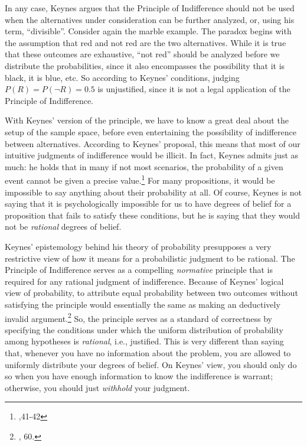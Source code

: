 In any case, Keynes argues that the Principle of
Indifference should not be used when the alternatives under
consideration can be further analyzed, or, using his term,
``divisible''. Consider again the marble example. The paradox begins
with the assumption that red and not red are the two alternatives. While
it is true that these outcomes are exhaustive, ``not red'' should be
analyzed before we distribute the probabilities, since it also
encompasses the possibility that it is black, it is blue, etc. So
according to Keynes' conditions, judging \(P(R) = P(\neg R) = 0.5\) is
unjustified, since it is not a legal application of the Principle of
Indifference.

With Keynes' version of the principle, we have to know a great deal
about the setup of the sample space, before even entertaining the
possibility of indifference between alternatives. According to Keynes'
proposal, this means that most of our intuitive judgments of
indifference would be illicit. In fact, Keynes admits just as much: he
holds that in many if not most scenarios, the probability of a given
event cannot be given a precise value.\footnote{\cite{keynes},41-42} For many propositions, it would
be impossible to say anything about their probability at all. Of course,
Keynes is not saying that it is psychologically impossible for us to
have degrees of belief for a proposition that fails to satisfy these
conditions, but he is saying that they would not be \emph{rational}
degrees of belief.

Keynes' epistemology behind his theory of probability presupposes a very restrictive view of how it means for a probabilistic judgment to be rational.  The Principle of Indifference serves as a compelling \emph{normative} principle that is required for any rational judgment of indifference. Because of Keynes' logical view of probability, to attribute equal probability between two outcomes without satisfying the principle would essentially the same as making an deductively invalid argument.\footnote{\cite{keynes}, 60.}
So, the principle serves as a standard of correctness by specifying the conditions under which the uniform distribution of probability among hypotheses is \emph{rational}, i.e., justified. This is very different than saying that, whenever you have no information about the problem, you are allowed to uniformly distribute your degrees of belief. On Keynes' view, you should only do so when you have enough information to know the indifference is warrant; otherwise, you should just \emph{withhold} your judgment.

